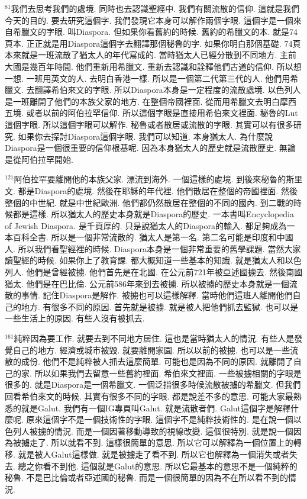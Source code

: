 \documentclass{book}
\begin{document}
$^{81}$我們去思考我們的處境.
同時也去認識聖經中.
我們有關流散的信仰.
這就是我們今天的目的.
要去研究這個字.
我們發現它本身可以解作兩個字眼.
這個字是一個來自希臘文的字眼.
叫Diaspora.
但如果你看舊約的時候.
舊約的希臘文的本.
就是74頁本.
正正就是用Diaspora這個字去翻譯那個秘魯的字.
如果你明白那個基礎.
74頁本來就是一班流散了猶太人的年代寫成的.
當時猶太人已經分散到不同地方.
主前大國是幾百年時間.
他們重新用希臘文.
重新去認識和詮釋他們古道的信仰.
所以想一想.
一班用英文的人.
去明白香港一樣.
所以是一個第二代第三代的人.
他們用希臘文.
去翻譯希伯來文的字眼.
所以Diaspora本身是一定程度的流散處境.
以色列人是一班離開了他們的本族父家的地方.
在整個帝國裡面.
從而用希臘文去明白摩西五境.
或者以前的阿伯拉罕信仰.
所以這個字眼是直接用希伯來文裡面.
秘魯的Lut這個字眼.
所以這個字眼可以解作.
秘魯或者散居或流散的字眼.
其實可以有很多研究.
如果你去探討Diaspora這個字眼.
我們可以知道.
本身猶太人.
為什麼說Diaspora是一個很重要的信仰根基呢.
因為本身猶太人的歷史就是流散歷史.
無論是從阿伯拉罕開始.

$^{121}$阿伯拉罕要離開他的本族父家.
漂流到海外.
一個這樣的處境.
到後來秘魯的斯里文.
都是Diaspora的處境.
然後在耶穌的年代裡.
他們散居在整個的帝國裡面.
然後整個的中世紀.
就是中世紀歐洲.
他們都仍然散居在整個的不同的國內.
到二戰的時候都是這樣.
所以猶太人的歷史本身就是Diaspora的歷史.
一本書叫Encyclopedia of Jewish Diaspora.
是千頁厚的.
只是說猶太人的Diaspora的輸入.
都足夠成為一本百科全書.
所以是一個非常流散的.
猶太人是第一名.
第二名可能是印度和中國人.
所以我們看聖經裡的時候.
Diaspora本身是一個非常重要的舊學課題.
當然大家讀聖經的時候.
如果你上了教育課.
都大概知道一些基本的知識.
就是猶太人和以色列人.
他們是曾經被擄.
他們首先是在北國.
在公元前721年被亞述國擄去.
然後南國猶太.
他們是在巴比倫.
公元前586年來到去被擄.
所以被擄的歷史本身就是一個流散的事情.
記住Diaspora是解作.
被擄也可以這樣解釋.
當時他們這班人離開他們自己的地方.
有很多不同的原因.
首先就是被擄.
就是被人把他們抓去監獄.
也可以是一些生活上的原因.
有些人沒有被抓去.

$^{161}$純粹因為要工作.
就要去到不同地方居住.
這也是當時猶太人的情況.
有些人是發覺自己的地方.
經濟或城市被毀.
就要離開家園.
所以以前的被擄.
也可以是一些流散的成份.
他們不是純粹被人抓去這麼簡單.
可能也是因為不同的原因.
就離開了自己的家.
所以如果我們去留意一些舊約裡面.
希伯來文裡面.
一些被擄相關的字眼是很多的.
就是Diaspora是一個希臘文.
一個泛指很多時候流散被擄的希臘文.
但我們回看希伯來文的時候.
其實有很多不同的字眼.
都是說差不多的意思.
可能大家最熟悉的就是Galut.
我們有一個IG專頁叫Galut.
就是流散者們.
Galut這個字是解釋什麼呢.
原來這個字不是一個技術性的字眼.
這個字不是純粹技術性的.
是在說一個以色列人被擄的情況.
而是一個因著移動導致的視線改變.
這個很特別.
就是說一個因為被擄走了.
所以就看不到.
這樣很簡單的意思.
所以它可以解釋為一個位置上的轉移.
就是被人Galut這樣做.
就是被擄走了看不到.
所以它也解釋為一個消失或者失去.
總之你看不到他.
這個就是Galut的意思.
所以它最基本的意思不是一個純粹的秘魯.
不是巴比倫或者亞述國的秘魯.
而是一個很簡單的因為不在所以看不到的情況.
\end{document}
